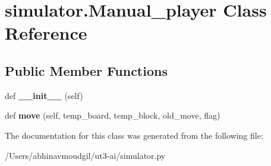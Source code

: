 \hypertarget{classsimulator_1_1_manual__player}{}\section{simulator.\+Manual\+\_\+player Class Reference}
\label{classsimulator_1_1_manual__player}
\subsection*{Public Member Functions}
\begin{DoxyCompactItemize}
\item 
def {\bfseries \+\_\+\+\_\+init\+\_\+\+\_\+} (self)\hypertarget{classsimulator_1_1_manual__player_a7ad3ae722a30179456c3aaa99723e691}{}\label{classsimulator_1_1_manual__player_a7ad3ae722a30179456c3aaa99723e691}

\item 
def {\bfseries move} (self, temp\+\_\+board, temp\+\_\+block, old\+\_\+move, flag)\hypertarget{classsimulator_1_1_manual__player_a1668ba6e718ba103b78734ac520d8de2}{}\label{classsimulator_1_1_manual__player_a1668ba6e718ba103b78734ac520d8de2}

\end{DoxyCompactItemize}


The documentation for this class was generated from the following file\+:\begin{DoxyCompactItemize}
\item 
/\+Users/abhinavmoudgil/ut3-\/ai/simulator.\+py\end{DoxyCompactItemize}
